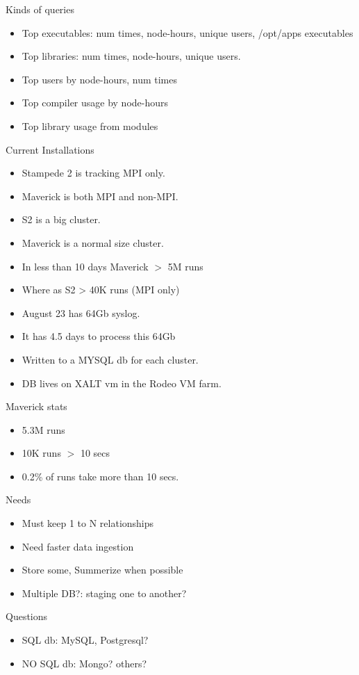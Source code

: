\documentclass{beamer}
\begin{document}
\begin{frame}{Kinds of queries}
  \begin{itemize}
    \item Top executables: num times, node-hours, unique users,
      /opt/apps executables
    \item Top libraries: num times, node-hours, unique users.
    \item Top users by node-hours, num times
    \item Top compiler usage by node-hours
    \item Top library usage from modules
  \end{itemize}
\end{frame}

\begin{frame}{Current Installations}
  \begin{itemize}
    \item Stampede 2 is tracking MPI only.
    \item Maverick is both MPI and non-MPI.
    \item S2 is a big cluster.
    \item Maverick is a normal size cluster.
    \item In less than 10 days Maverick $>$ 5M runs
    \item Where as S2 > 40K runs (MPI only)
    \item August 23 has 64Gb syslog. 
    \item It has 4.5 days to process this 64Gb
    \item Written to a MYSQL db for each cluster.
    \item DB lives on XALT vm in the Rodeo VM farm.
  \end{itemize}
\end{frame}

\begin{frame}{Maverick stats}
  \begin{itemize}
    \item 5.3M runs
    \item 10K runs $>$ 10 secs
    \item 0.2\% of runs take more than 10 secs.
  \end{itemize}
\end{frame}

\begin{frame}{Needs}
  \begin{itemize}
    \item Must keep 1 to N relationships
    \item Need faster data ingestion
    \item Store some, Summerize when possible
    \item Multiple DB?: staging one to another?
  \end{itemize}
\end{frame}

\begin{frame}{Questions}
  \begin{itemize}
    \item SQL db: MySQL, Postgresql?
    \item NO SQL db: Mongo? others?
  \end{itemize}
\end{frame}
\end{document}
